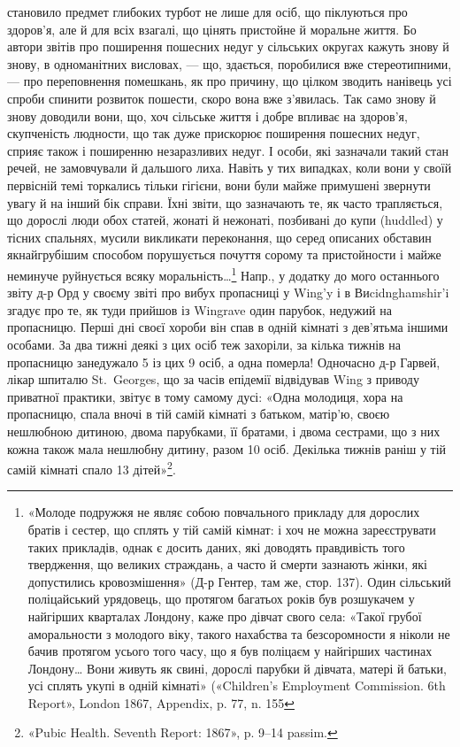 \parcont{}  %
становило предмет глибоких турбот не лише для осіб, що піклуються
про здоров’я, але й для всіх взагалі, що цінять пристойне
й моральне життя. Бо автори звітів про поширення пошесних
недуг у сільських округах кажуть знову й знову, в одноманітних
висловах, — що, здається, поробилися вже стереотипними, — про
переповнення помешкань, як про причину, що цілком зводить
нанівець усі спроби спинити розвиток пошести, скоро вона вже
з’явилась. Так само знову й знову доводили вони, що, хоч сільське
життя і добре впливає на здоров’я, скупченість людности,
що так дуже прискорює поширення пошесних недуг, сприяє
також і поширенню незаразливих недуг. І особи, які зазначали
такий стан речей, не замовчували й дальшого лиха. Навіть у тих
випадках, коли вони у своїй первісній темі торкались тільки
гігієни, вони були майже примушені звернути увагу й на інший
бік справи. Їхні звіти, що зазначають те, як часто трапляється, що
дорослі люди обох статей, жонаті й нежонаті, позбивані до купи
(huddled) у тісних спальнях, мусили викликати переконання,
що серед описаних обставин якнайгрубішим способом порушується
почуття сорому та пристойности і майже неминуче руйнується
всяку моральність\dots{}\footnote{
«Молоде подружжя не являє собою повчального прикладу для
дорослих братів і сестер, що сплять у тій самій кімнат: і хоч не можна
зареєструвати таких прикладів, однак є досить даних, які доводять правдивість
того твердження, що великих страждань, а часто й смерти зазнають
жінки, які допустились кровозмішення» (Д-р Гентер, там же, стор. 137).
Один сільський поліцайський урядовець, що протягом багатьох років
був розшукачем у найгірших кварталах Лондону, каже про дівчат свого
села: «Такої грубої аморальности з молодого віку, такого нахабства
та безсоромности я ніколи не бачив протягом усього того часу, що я був
поліцаєм у найгірших частинах Лондону\dots{} Вони живуть як свині, дорослі
парубки й дівчата, матері й батьки, усі сплять укупі в одній кімнаті»
(«Children’s Employment Commission. 6th Report», London 1867, Appendix,
p. 77, n. 155
} Напр., у додатку до мого останнього звіту
д-р Орд у своєму звіті про вибух пропасниці у Wing’y і в Виcidnghamshir’i
згадує про те, як туди прийшов із Wingrave один
парубок, недужий на пропасницю. Перші дні своєї хороби він
спав в одній кімнаті з дев’ятьма іншими особами. За два тижні
деякі з цих осіб теж захоріли, за кілька тижнів на пропасницю
занедужало 5 із цих 9 осіб, а одна померла! Одночасно
д-р Гарвей, лікар шпиталю St.~Georges, що за часів епідемії відвідував
Wing з приводу приватної практики, звітує в тому самому
дусі: «Одна молодиця, хора на пропасницю, спала вночі
в тій самій кімнаті з батьком, матір’ю, своєю нешлюбною дитиною,
двома парубками, її братами, і двома сестрами, що з них
кожна також мала нешлюбну дитину, разом 10 осіб. Декілька
тижнів раніш у тій самій кімнаті спало 13 дітей»\footnote{
«Pubic Health. Seventh Report: 1867», p. 9--14 passim.
}.

